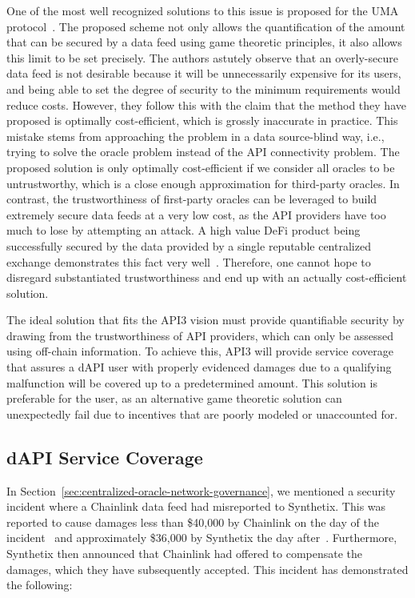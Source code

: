 \documentclass[11pt]{article}
\begin{document}
One of the most well recognized solutions to this issue is proposed for the UMA protocol~\cite{uma:2020}.
The proposed scheme not only allows the quantification of the amount that can be secured by a data feed using game theoretic principles, it also allows this limit to be set precisely.
The authors astutely observe that an overly-secure data feed is not desirable because it will be unnecessarily expensive for its users, and being able to set the degree of security to the minimum requirements would reduce costs.
However, they follow this with the claim that the method they have proposed is optimally cost-efficient, which is grossly inaccurate in practice.
This mistake stems from approaching the problem in a data source-blind way, i.e., trying to solve the oracle problem instead of the API connectivity problem.
The proposed solution is only optimally cost-efficient if we consider all oracles to be untrustworthy, which is a close enough approximation for third-party oracles.
In contrast, the trustworthiness of first-party oracles can be leveraged to build extremely secure data feeds at a very low cost, as the API providers have too much to lose by attempting an attack.
A high value DeFi product being successfully secured by the data provided by a single reputable centralized exchange demonstrates this fact very well~\cite{coinbase}.
Therefore, one cannot hope to disregard substantiated trustworthiness and end up with an actually cost-efficient solution.

The ideal solution that fits the API3 vision must provide quantifiable security by drawing from the trustworthiness of API providers, which can only be assessed using off-chain information.
To achieve this, API3 will provide service coverage that assures a dAPI user with properly evidenced damages due to a qualifying malfunction will be covered up to a predetermined amount.
This solution is preferable for the user, as an alternative game theoretic solution can unexpectedly fail due to incentives that are poorly modeled or unaccounted for.

\subsection{dAPI Service Coverage}
\label{sec:dapi-service-coverage}

In Section~\ref{sec:centralized-oracle-network-governance}, we mentioned a security incident where a Chainlink data feed had misreported to Synthetix.
This was reported to cause damages less than \$40,000 by Chainlink on the day of the incident~\cite{chainlink-fatfinger} and approximately \$36,000 by Synthetix the day after~\cite{synthetix-fatfinger}.
Furthermore, Synthetix then announced that Chainlink had offered to compensate the damages, which they have subsequently accepted.
This incident has demonstrated the following:
\end{document}
